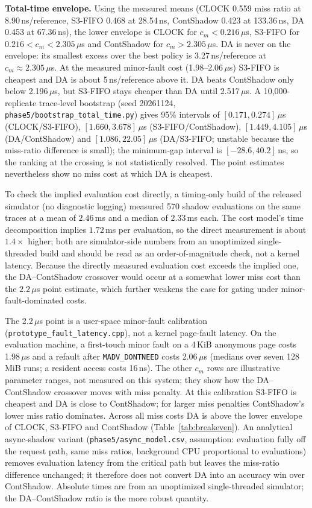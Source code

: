 \documentclass[10pt,twocolumn,a4paper]{IEEEtran}
\begin{document}
\textbf{Total-time envelope.}
Using the measured means (CLOCK 0.559 miss ratio at 8.90\,ns/reference,
S3-FIFO 0.468 at 28.54\,ns, ContShadow 0.423 at 133.36\,ns, DA 0.453 at
67.36\,ns), the lower envelope is CLOCK for $c_m<0.216\,\mu$s, S3-FIFO for
$0.216<c_m<2.305\,\mu$s and ContShadow for $c_m>2.305\,\mu$s. DA is never on
the envelope: its smallest excess over the best policy is
3.27\,ns/reference at $c_m\approx2.305\,\mu$s. At the measured minor-fault
cost (1.98--2.06\,$\mu$s) S3-FIFO is cheapest and DA is about 5\,ns/reference
above it. DA beats ContShadow only below 2.196\,$\mu$s, but S3-FIFO stays
cheaper than DA until 2.517\,$\mu$s. A 10,000-replicate trace-level bootstrap
(seed 20261124, \texttt{phase5/bootstrap\_total\_time.py}) gives 95\% intervals
of $[0.171,0.274]\,\mu$s (CLOCK/S3-FIFO), $[1.660,3.678]\,\mu$s
(S3-FIFO/ContShadow), $[1.449,4.105]\,\mu$s (DA/ContShadow) and
$[1.086,22.05]\,\mu$s (DA/S3-FIFO; unstable because the miss-ratio difference
is small); the minimum-gap interval is $[-28.6,40.2]$\,ns, so the ranking at
the crossing is not statistically resolved. The point estimates nevertheless
show no miss cost at which DA is cheapest.

To check the implied evaluation cost directly, a timing-only build of the
released simulator (no diagnostic logging) measured 570 shadow evaluations on
the same traces at a mean of $2.46$\,ms and a median of $2.33$\,ms each. The
cost model's time decomposition implies $1.72$\,ms per evaluation, so the
direct measurement is about $1.4\times$ higher; both are simulator-side
numbers from an unoptimized single-threaded build and should be read as an
order-of-magnitude check, not a kernel latency. Because the directly measured
evaluation cost exceeds the implied one, the DA--ContShadow crossover would
occur at a somewhat lower miss cost than the $2.2\,\mu$s point estimate, which
further weakens the case for gating under minor-fault-dominated costs.



The 2.2\,$\mu$s point is a user-space minor-fault calibration
(\texttt{prototype\_fault\_latency.cpp}), not a kernel page-fault latency.
On the evaluation machine, a first-touch minor fault on a 4\,KiB anonymous page
costs 1.98\,$\mu$s and a refault after \texttt{MADV\_DONTNEED} costs
2.06\,$\mu$s (medians over seven 128\,MiB runs; a resident access costs
16\,ns). The other $c_m$ rows are illustrative parameter ranges, not measured
on this system; they show how the DA--ContShadow crossover moves with miss
penalty. At this calibration S3-FIFO is cheapest and DA is close to
ContShadow; for larger miss penalties ContShadow's lower miss ratio dominates.
Across all miss costs DA is above the lower envelope of CLOCK, S3-FIFO and
ContShadow (Table~\ref{tab:breakeven}). An analytical async-shadow variant
(\texttt{phase5/async\_model.csv}, assumption: evaluation fully off the
request path, same miss ratios, background CPU proportional to evaluations)
removes evaluation latency from the critical path but leaves the miss-ratio
difference unchanged; it therefore does not convert DA into an accuracy win
over ContShadow. Absolute times are from an unoptimized single-threaded
simulator; the DA--ContShadow ratio is the more robust quantity.
\end{document}
